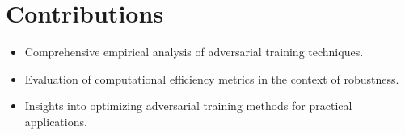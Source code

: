 \documentclass{article}
\begin{document}
\section{Contributions}
\begin{itemize}
    \item Comprehensive empirical analysis of adversarial training techniques.
    \item Evaluation of computational efficiency metrics in the context of robustness.
    \item Insights into optimizing adversarial training methods for practical applications.
\end{itemize}



\end{document}
